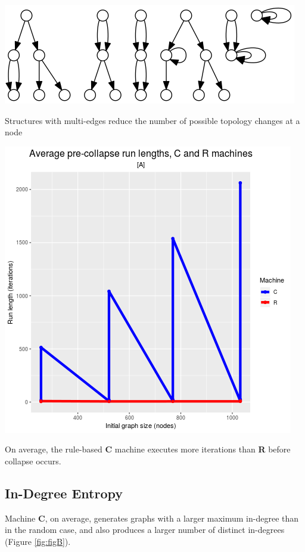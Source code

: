 \documentclass{tufte-handout}
\begin{document}
\begin{marginfigure}
\includegraphics{exemplar.png}
\caption{Structures with multi-edges reduce the number of possible topology
changes at a node}
\label{fig:Multiedges}
\end{marginfigure}

\begin{marginfigure}
  \includegraphics{figA.png}
  \caption{On average, the rule-based \textbf{C} machine executes more iterations than \textbf{R} before collapse occurs.}
  \label{fig:figA}
\end{marginfigure}

\subsection{In-Degree Entropy}

Machine \textbf{C}, on average, generates graphs with a larger 
maximum in-degree than in the random case, and also produces a
larger number of distinct in-degrees (Figure \ref{fig:figB}).
\end{document}
